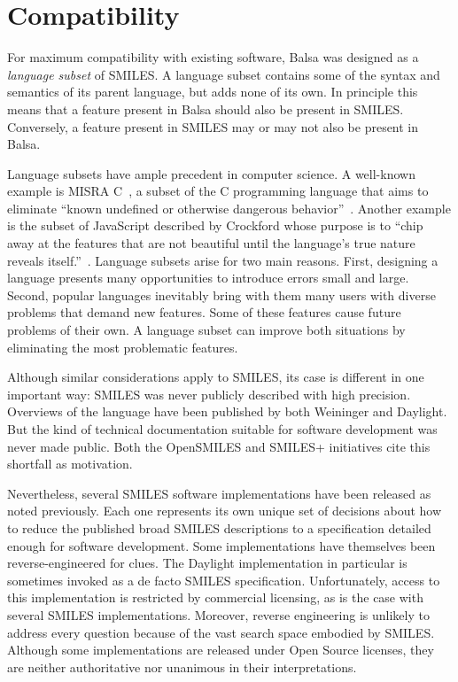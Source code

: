 \documentclass{article}
\begin{document}
\section*{Compatibility}

For maximum compatibility with existing software, Balsa was designed as a \textit{language subset} of SMILES. A language subset contains some of the syntax and semantics of its parent language, but adds none of its own. In principle this means that a feature present in Balsa should also be present in SMILES. Conversely, a feature present in SMILES may or may not also be present in Balsa.

Language subsets have ample precedent in computer science. A well-known example is MISRA C~\cite{misraC}, a subset of the C programming language that aims to eliminate \enquote{known undefined or otherwise dangerous behavior}~\cite{hatton:2007}. Another example is the subset of JavaScript described by Crockford whose purpose is to \enquote{chip away at the features that are not beautiful until the language's true nature reveals itself.}~\cite{crockford:2008}. Language subsets arise for two main reasons. First, designing a language presents many opportunities to introduce errors small and large. Second, popular languages inevitably bring with them many users with diverse problems that demand new features. Some of these features cause future problems of their own. A language subset can improve both situations by eliminating the most problematic features.

Although similar considerations apply to SMILES, its case is different in one important way: SMILES was never publicly described with high precision. Overviews of the language have been published by both Weininger and Daylight. But the kind of technical documentation suitable for software development was never made public. Both the OpenSMILES and SMILES+ initiatives cite this shortfall as motivation.

Nevertheless, several SMILES software implementations have been released as noted previously. Each one represents its own unique set of decisions about how to reduce the published broad SMILES descriptions to a specification detailed enough for software development. Some implementations have themselves been reverse-engineered for clues. The Daylight implementation in particular is sometimes invoked as a de facto SMILES specification. Unfortunately, access to this implementation is restricted by commercial licensing, as is the case with several SMILES implementations. Moreover, reverse engineering is unlikely to address every question because of the vast search space embodied by SMILES. Although some implementations are released under Open Source licenses, they are neither authoritative nor unanimous in their interpretations.
\end{document}
